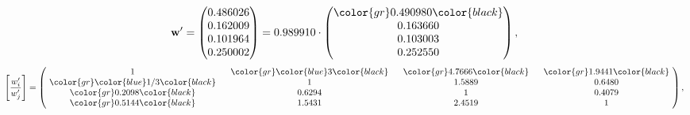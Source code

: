 \begin{example}
\begin{equation*}
\mathbf{w}^{\prime} =
\begin{pmatrix}
0.486026\\
0.162009\\
0.101964\\
0.250002
\end{pmatrix} =
0.989910\cdot
\begin{pmatrix}
\color{gr} 0.490980\color{black} \\
0.163660\\
0.103003\\
0.252550
\end{pmatrix},
\end{equation*}
\begin{equation*}
\left[ \frac{{w}^{\prime}_i}{{w}^{\prime}_j} \right] =
\begin{pmatrix}
$\,\,$ 1 $\,\,$ & $\,\,$\color{gr} \color{blue} 3\color{black} $\,\,$ & $\,\,$\color{gr} 4.7666\color{black} $\,\,$ & $\,\,$\color{gr} 1.9441\color{black} $\,\,$ \\
$\,\,$\color{gr} \color{blue}  1/3\color{black} $\,\,$ & $\,\,$ 1 $\,\,$ & $\,\,$1.5889$\,\,$ & $\,\,$0.6480  $\,\,$ \\
$\,\,$\color{gr} 0.2098\color{black} $\,\,$ & $\,\,$0.6294$\,\,$ & $\,\,$ 1 $\,\,$ & $\,\,$0.4079 $\,\,$ \\
$\,\,$\color{gr} 0.5144\color{black} $\,\,$ & $\,\,$1.5431$\,\,$ & $\,\,$2.4519$\,\,$ & $\,\,$ 1  $\,\,$ \\
\end{pmatrix},
\end{equation*}
\end{example}
\newpage
